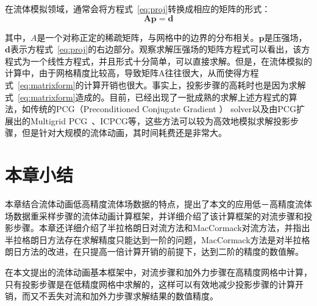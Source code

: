 在流体模拟领域，通常会将方程式~\ref{eq:proj}转换成相应的矩阵的形式：
\begin{equation}
\label{eq:matrixform}
\boldsymbol {Ap} = \boldsymbol {d}
\end{equation}

 其中，$A$是一个对称正定的稀疏矩阵，与网格中的边界的分布相关。$\boldsymbol p$是压强场，$\boldsymbol d$表示方程式~\ref{eq:proj}的右边部分。观察求解压强场的矩阵方程式可以看出，该方程式为一个线性方程式，并且形式十分简单，可以直接求解。但是，在流体模拟的计算中，由于网格精度比较高，导致矩阵A往往很大，从而使得方程式~\ref{eq:matrixform}的计算开销也很大。事实上，投影步骤的高耗时也是因为求解式~\ref{eq:matrixform}造成的。目前，已经出现了一批成熟的求解上述方程式的算法，如传统的PCG（Preconditioned Conjugate Gradient ） solver以及由PCG扩展出的Multigrid PCG~\cite{mcadams2010parallel}、ICPCG等，这些方法可以较为高效地模拟求解投影步骤，但是针对大规模的流体动画，其时间耗费还是非常大。

\section{本章小结}

本章结合流体动画低高精度流体场数据的特点，提出了本文的应用低－高精度流体场数据重采样步骤的流体动画计算框架，并详细介绍了该计算框架的对流步骤和投影步骤。本章还详细介绍了半拉格朗日对流方法和MacCormack对流方法，并指出半拉格朗日方法存在求解精度只能达到一阶的问题，MacCormack方法是对半拉格朗日方法的改进，在只提高一倍计算开销的前提下，达到二阶的精度的数值解。

在本文提出的流体动画基本框架中，对流步骤和加外力步骤在高精度网格中计算，只有投影步骤是在低精度网格中求解的，这样可以有效地减少投影步骤的计算开销，而又不丢失对流和加外力步骤求解结果的数值精度。


